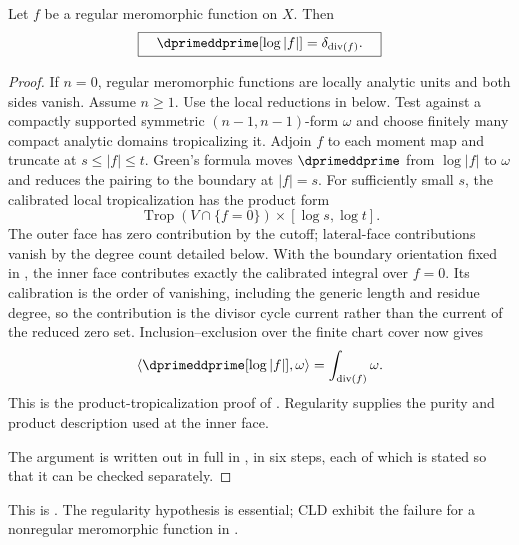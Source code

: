 \begin{theorem}\label{thm:cld-poincare-lelong}
Let $f$ be a regular meromorphic function on $X$.  Then
\[
                    \boxed{\quad
                    \dprimeddprime[\log|f|]
                    =\delta_{\operatorname{div}(f)}.
                    \quad}
\]
\end{theorem}
\begin{proof}
If $n=0$, regular meromorphic functions are locally analytic units and
both sides vanish. Assume $n\geq1$.
Use the local reductions in  below. Test
against a compactly supported symmetric $(n-1,n-1)$-form $\omega$ and choose
finitely many compact analytic domains tropicalizing it.  Adjoin $f$ to each
moment map and truncate at $s\le|f|\le t$.  Green's formula moves
$\dprimeddprime$ from $\log|f|$ to $\omega$ and reduces the pairing to the
boundary at $|f|=s$.  For sufficiently small $s$, the calibrated local
tropicalization has the product form
\[
          \operatorname{Trop}(V\cap\{f=0\})
                    \times[\log s,\log t].
\]
The outer face has zero contribution by the cutoff; lateral-face
contributions vanish by the degree count detailed below.  With the boundary orientation fixed in
, the inner face contributes exactly the
calibrated integral over $f=0$.  Its calibration is the order of vanishing,
including the generic length and residue degree, so the contribution is the
divisor cycle current rather than the current of the reduced zero set.
Inclusion--exclusion over the finite chart cover now gives
\[
 \langle\dprimeddprime[\log|f|],\omega\rangle
       =\int_{\operatorname{div}(f)}\omega.
\]
This is the product-tropicalization proof of
\cite[Theorem~16.7.3 and \S16.7]{CLD25}.  Regularity supplies the purity and
product description used at the inner face.

The argument is written out in full in
, in six steps, each of which is stated so
that it can be checked separately.
\end{proof}

This is \cite[Theorem~16.7.3]{CLD25}.  The regularity hypothesis is
essential; CLD exhibit the failure for a nonregular meromorphic function in
\cite[Example~16.1.4]{CLD25}.

